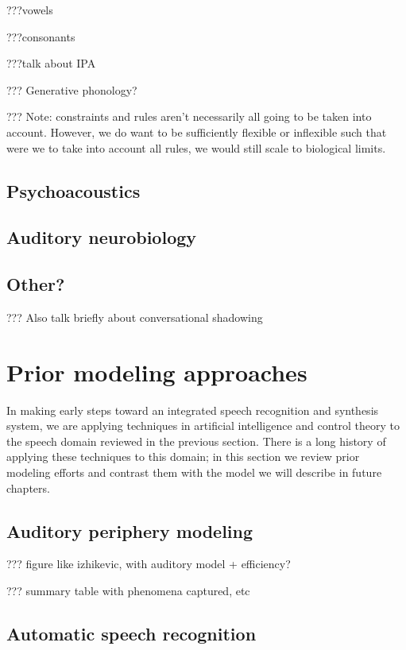 ???vowels

???consonants

???talk about IPA %

??? Generative phonology?

??? Note: constraints and rules aren't necessarily all going to
be taken into account. However, we do want to be sufficiently
flexible or inflexible such that were we to take into account
all rules, we would still scale to biological limits.

\subsection{Psychoacoustics}

\subsection{Auditory neurobiology}

\subsection{Other?}

??? Also talk briefly about conversational shadowing

\section{Prior modeling approaches}

In making early steps toward
an integrated speech recognition and synthesis system,
we are applying techniques
in artificial intelligence and control theory
to the speech domain reviewed in the previous section.
There is a long history of applying these techniques
to this domain;
in this section we review prior modeling efforts
and contrast them with the model we will describe
in future chapters.

\subsection{Auditory periphery modeling}

??? figure like izhikevic, with auditory model + efficiency?

??? summary table with phenomena captured, etc

\subsection{Automatic speech recognition}

